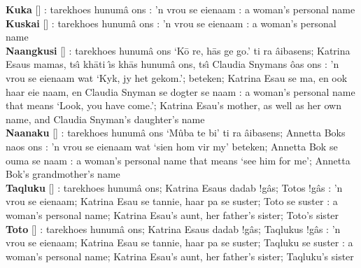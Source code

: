 \textbf{Kuka} [] : tarekhoes
\textdoublebarpipe{}hunum\^{a} \textvertline{}ons : 'n
vrou se eienaam : a woman's personal name \\

\textbf{Kuskai} [] : tarekhoes
\textdoublebarpipe{}hunum\^{a} \textvertline{}ons : 'n
vrou se eienaam : a woman's personal name \\

\textbf{N\textvertline{}aangkusi}
[] : tarekhoes
\textdoublebarpipe{}hunum\^{a} \textvertline{}ons `K\={o} re, h\={a}s
ge go.' ti ra \textdoublebarpipe{}\^{a}ibasens; Katrina Esaus mamas,
ts\^{\i} \textdoublevertline{}kh\={a}ti \textdoublevertline{}\^{\i}s
\textvertline{}kh\={a}s \textdoublebarpipe{}hunum\^{a}
\textvertline{}ons, ts\^{\i} Claudia Snymans \^{o}as
\textvertline{}ons : 'n vrou se eienaam wat `Kyk, jy het
gekom.'; beteken; Katrina Esau se ma, en ook haar eie naam, en Claudia
Snyman se dogter se naam : a woman's personal name that
means `Look, you have come.'; Katrina Esau's mother, as well as her
own name, and Claudia Snyman's daughter's name \\

\textbf{N\textvertline{}aanaku}
[] : tarekhoes
\textdoublebarpipe{}hunum\^{a} \textvertline{}ons `M\^{u}ba te bi' ti
ra \textdoublebarpipe{}\^{a}ibasens; Annetta Boks
\textdoublevertline{}naos \textvertline{}ons : 'n vrou
se eienaam wat `sien hom vir my' beteken; Annetta Bok se ouma se naam
: a woman's personal name that means `see him for me';
Annetta Bok's grandmother's name \\

\textbf{Taqluku} [] :
tarekhoes \textdoublebarpipe{}hunum\^{a} \textvertline{}ons; Katrina
Esaus dadab !g\^{a}s; Totos !g\^{a}s : 'n vrou se
eienaam; Katrina Esau se tannie, haar pa se suster; Toto se suster
: a woman's personal name; Katrina Esau's aunt, her
father's sister; Toto's sister \\

\textbf{Toto} [] : tarekhoes
\textdoublebarpipe{}hunum\^{a} \textvertline{}ons; Katrina Esaus dadab
!g\^{a}s; Taqlukus !g\^{a}s : 'n vrou se eienaam;
Katrina Esau se tannie, haar pa se suster; Taqluku se suster
: a woman's personal name; Katrina Esau's aunt, her
father's sister; Taqluku's sister \\

